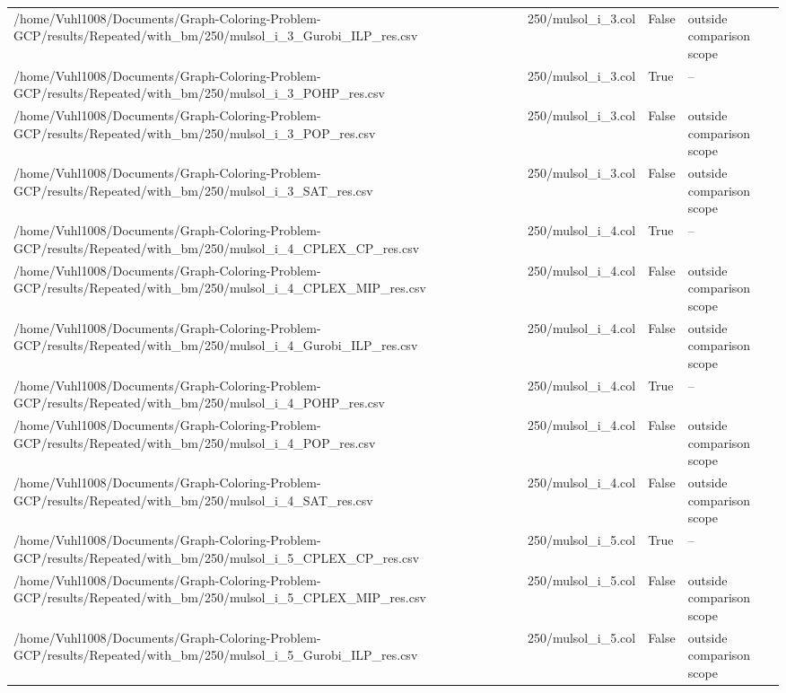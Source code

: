 \begin{table}[htbp]
\begin{tabular}{llll}
/home/Vuhl1008/Documents/Graph-Coloring-Problem-GCP/results/Repeated/with\_bm/250/mulsol\_i\_3\_Gurobi\_ILP\_res.csv & 250/mulsol\_i\_3.col & False & outside comparison scope \\
/home/Vuhl1008/Documents/Graph-Coloring-Problem-GCP/results/Repeated/with\_bm/250/mulsol\_i\_3\_POHP\_res.csv & 250/mulsol\_i\_3.col & True & -- \\
/home/Vuhl1008/Documents/Graph-Coloring-Problem-GCP/results/Repeated/with\_bm/250/mulsol\_i\_3\_POP\_res.csv & 250/mulsol\_i\_3.col & False & outside comparison scope \\
/home/Vuhl1008/Documents/Graph-Coloring-Problem-GCP/results/Repeated/with\_bm/250/mulsol\_i\_3\_SAT\_res.csv & 250/mulsol\_i\_3.col & False & outside comparison scope \\
/home/Vuhl1008/Documents/Graph-Coloring-Problem-GCP/results/Repeated/with\_bm/250/mulsol\_i\_4\_CPLEX\_CP\_res.csv & 250/mulsol\_i\_4.col & True & -- \\
/home/Vuhl1008/Documents/Graph-Coloring-Problem-GCP/results/Repeated/with\_bm/250/mulsol\_i\_4\_CPLEX\_MIP\_res.csv & 250/mulsol\_i\_4.col & False & outside comparison scope \\
/home/Vuhl1008/Documents/Graph-Coloring-Problem-GCP/results/Repeated/with\_bm/250/mulsol\_i\_4\_Gurobi\_ILP\_res.csv & 250/mulsol\_i\_4.col & False & outside comparison scope \\
/home/Vuhl1008/Documents/Graph-Coloring-Problem-GCP/results/Repeated/with\_bm/250/mulsol\_i\_4\_POHP\_res.csv & 250/mulsol\_i\_4.col & True & -- \\
/home/Vuhl1008/Documents/Graph-Coloring-Problem-GCP/results/Repeated/with\_bm/250/mulsol\_i\_4\_POP\_res.csv & 250/mulsol\_i\_4.col & False & outside comparison scope \\
/home/Vuhl1008/Documents/Graph-Coloring-Problem-GCP/results/Repeated/with\_bm/250/mulsol\_i\_4\_SAT\_res.csv & 250/mulsol\_i\_4.col & False & outside comparison scope \\
/home/Vuhl1008/Documents/Graph-Coloring-Problem-GCP/results/Repeated/with\_bm/250/mulsol\_i\_5\_CPLEX\_CP\_res.csv & 250/mulsol\_i\_5.col & True & -- \\
/home/Vuhl1008/Documents/Graph-Coloring-Problem-GCP/results/Repeated/with\_bm/250/mulsol\_i\_5\_CPLEX\_MIP\_res.csv & 250/mulsol\_i\_5.col & False & outside comparison scope \\
/home/Vuhl1008/Documents/Graph-Coloring-Problem-GCP/results/Repeated/with\_bm/250/mulsol\_i\_5\_Gurobi\_ILP\_res.csv & 250/mulsol\_i\_5.col & False & outside comparison scope \\

\end{tabular}
\end{table}
